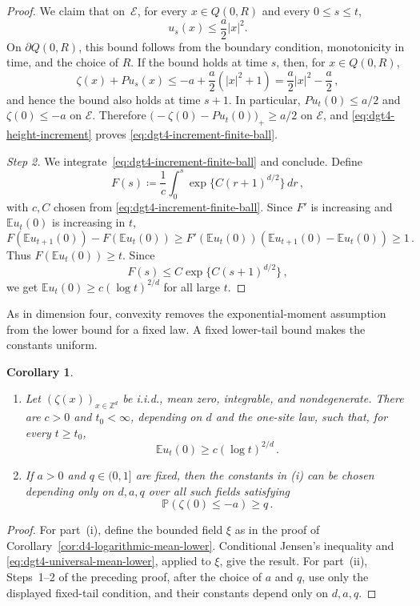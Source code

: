 \documentclass[11pt]{amsart}
\theoremstyle{plain}
\newtheorem{corollary}[theorem]{Corollary}
\theoremstyle{definition}
\newcommand{\Z}{\mathbb{Z}}
\newcommand{\E}{\mathbb{E}}
\renewcommand{\P}{\mathbb{P}}
\begin{document}
\begin{proof}
		We claim that on~$\mathcal{E}$, for every $x\in Q(0,R)$ and every $0\leq s\leq t$, 
		\[
			u_s(x)\leq \frac a2 |x|^2.
		\]
		On $\partial Q(0,R)$, this bound follows from the boundary condition,
		monotonicity in time, and the choice of $R$. If the bound holds at time $s$, then, for $x\in Q(0,R)$,
		\[
			\zeta(x)+Pu_s(x)
			\leq
			-a+\frac a2(|x|^2+1)
			=
			\frac a2|x|^2-\frac a2\, ,
		\]
		and hence the bound also holds at time $s+1$. In particular,
		$Pu_t(0)\leq a/2$ and $\zeta(0)\leq-a$ on $\mathcal E$. Therefore
		$\bigl(-\zeta(0)-Pu_t(0)\bigr)_+\geq a/2$ on $\mathcal E$, and
		\eqref{eq:dgt4-height-increment} proves
		\eqref{eq:dgt4-increment-finite-ball}.

		\emph{Step 2.} We integrate~\eqref{eq:dgt4-increment-finite-ball} and conclude. Define
		\[
			F(s)\coloneqq\frac1c\int_0^s\exp\{C(r+1)^{d/2}\}\,dr\, ,
		\]
		with $c,C$ chosen from \eqref{eq:dgt4-increment-finite-ball}. Since
		$F'$ is increasing and $\E u_t(0)$ is increasing in $t$,
		\[
			F(\E u_{t+1}(0))-F(\E u_t(0))
			\geq
			F'(\E u_t(0))(\E u_{t+1}(0)-\E u_t(0))
			\geq1\, .
		\]
		Thus $F(\E u_t(0))\geq t$. Since
		\[
			F(s)\leq C\exp\{C(s+1)^{d/2}\}\, ,
		\]
		we get $\E u_t(0)\geq c(\log t)^{2/d}$ for all large $t$.
	\end{proof}

As in dimension four, convexity removes the exponential-moment assumption
from the lower bound for a fixed law. A fixed lower-tail bound makes the
constants uniform.

\begin{corollary}\label{cor:dgt4-mean-lower}
	\begin{enumerate}[label=\textup{(\roman*)}]
		\item Let $(\zeta(x))_{x\in\Z^d}$ be i.i.d., mean zero, integrable, and
		nondegenerate. There are $c>0$ and $t_0<\infty$, depending on $d$ and the
		one-site law, such that, for every $t\geq t_0$,
		\[
			\E u_t(0)\geq c(\log t)^{2/d} \, .
		\]
		\item If $a>0$ and $q\in(0,1]$ are fixed, then the constants in
		\textup{(i)} can be chosen depending only on $d,a,q$ over all such fields
		satisfying
		\[
			\P(\zeta(0)\leq-a)\geq q\, .
		\]
	\end{enumerate}
\end{corollary}

\begin{proof}
	For part~\textup{(i)}, define the bounded field $\xi$ as in the proof of
	Corollary~\ref{cor:d4-logarithmic-mean-lower}. Conditional Jensen's inequality and
	\eqref{eq:dgt4-universal-mean-lower}, applied to $\xi$, give the result.
	For part~\textup{(ii)}, Steps~1--2 of the preceding proof, after the choice
	of $a$ and $q$, use only the displayed fixed-tail condition, and their
	constants depend only on $d,a,q$.
\end{proof}
\end{document}
